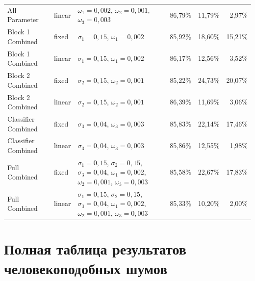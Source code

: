 \documentclass[a4paper]{article}
\begin{document}
\begin{longtable}{p{3.1cm}p{1.2cm}p{4.1cm}rrr}
All Parameter & linear & $\omega_1=0{,}002$, $\omega_2=0{,}001$, $\omega_3=0{,}003$ & 86{,}79\% & 11{,}79\% & 2{,}97\%\\
Block 1 Combined & fixed & $\sigma_1=0{,}15$, $\omega_1=0{,}002$ & 85{,}92\% & 18{,}60\% & 15{,}21\%\\
Block 1 Combined & linear & $\sigma_1=0{,}15$, $\omega_1=0{,}002$ & 86{,}17\% & 12{,}56\% & 3{,}52\%\\
Block 2 Combined & fixed & $\sigma_2=0{,}15$, $\omega_2=0{,}001$ & 85{,}22\% & 24{,}73\% & 20{,}07\%\\
Block 2 Combined & linear & $\sigma_2=0{,}15$, $\omega_2=0{,}001$ & 86{,}39\% & 11{,}69\% & 3{,}06\%\\
Classifier Combined & fixed & $\sigma_3=0{,}04$, $\omega_3=0{,}003$ & 85{,}83\% & 22{,}14\% & 17{,}46\%\\
Classifier Combined & linear & $\sigma_3=0{,}04$, $\omega_3=0{,}003$ & 85{,}86\% & 12{,}55\% & 1{,}98\%\\
Full Combined & fixed & $\sigma_1=0{,}15$, $\sigma_2=0{,}15$, $\sigma_3=0{,}04$, $\omega_1=0{,}002$, $\omega_2=0{,}001$, $\omega_3=0{,}003$ & 85{,}58\% & 22{,}67\% & 17{,}83\%\\
Full Combined & linear & $\sigma_1=0{,}15$, $\sigma_2=0{,}15$, $\sigma_3=0{,}04$, $\omega_1=0{,}002$, $\omega_2=0{,}001$, $\omega_3=0{,}003$ & 85{,}33\% & 10{,}20\% & 2{,}00\%\\
\bottomrule
\end{longtable}

\section{Полная таблица результатов человекоподобных шумов}
\end{document}
